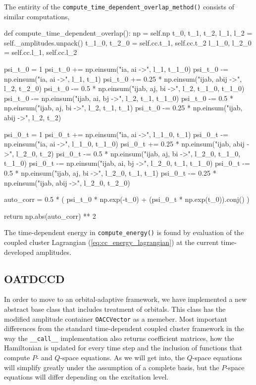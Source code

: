     The entirity of the \lstinline{compute_time_dependent_overlap_method()} consists of
    similar computations,
    \begin{python}
    def compute_time_dependent_overlap():
        np = self.np
        t_0, t_1, t_2, l_1, l_2 = self._amplitudes.unpack()
        t_1_0, t_2_0 = self.cc.t_1, self.cc.t_2 
        l_1_0, l_2_0 = self.cc.l_1, self.cc.l_2

        psi_t_0 = 1
        psi_t_0 += np.einsum("ia, ai ->", l_1, t_1_0)
        psi_t_0 -= np.einsum("ia, ai ->", l_1, t_1)
        psi_t_0 += 0.25 * np.einsum("ijab, abij ->", l_2, t_2_0)
        psi_t_0 -= 0.5 * np.einsum("ijab, aj, bi ->", l_2, t_1_0, t_1_0)
        psi_t_0 -= np.einsum("ijab, ai, bj ->", l_2, t_1, t_1_0)
        psi_t_0 -= 0.5 * np.einsum("ijab, aj, bi ->", l_2, t_1, t_1)
        psi_t_0 -= 0.25 * np.einsum("ijab, abij ->", l_2, t_2)
    
        psi_0_t = 1
        psi_0_t += np.einsum("ia, ai ->", l_1_0, t_1)
        psi_0_t -= np.einsum("ia, ai ->", l_1_0, t_1_0)
        psi_0_t += 0.25 * np.einsum("ijab, abij ->", l_2_0, t_2)
        psi_0_t -= 0.5 * np.einsum("ijab, aj, bi ->", l_2_0, t_1_0, t_1_0)
        psi_0_t -= np.einsum("ijab, ai, bj ->", l_2_0, t_1, t_1_0)
        psi_0_t -= 0.5 * np.einsum("ijab, aj, bi ->", l_2_0, t_1, t_1)
        psi_0_t -= 0.25 * np.einsum("ijab, abij ->", l_2_0, t_2_0)
    
        auto_corr = 0.5 * (
            psi_t_0 * np.exp(-t_0) 
            + (psi_0_t * np.exp(t_0)).conj()
        )

        return np.abs(auto_corr) ** 2
    \end{python}

    The time-dependent energy in \lstinline{compute_energy()} is found by evaluation of 
    the coupled cluster Lagrangian (\autoref{eq:cc_energy_lagrangian}) at the current 
    time-developed amplitudes.

    \subsection{OATDCCD}

    In order to move to an orbital-adaptive framework, we have implemented a new abstract 
    base class that includes treatment of orbitals. This class has the modified 
    amplitude container \lstinline{OACCVector} as a memeber. Most important differences 
    from the standard time-dependent coupled cluster framework in the way the 
    \lstinline{__call__} implementation also returns coefficient matrices, how the 
    Hamiltonian is updated for every time step and the inclusion of functions that 
    compute $P$- and $Q$-space equations. As we will get into, the $Q$-space equations 
    will simplify greatly under the assumption of a complete basis, but the $P$-space 
    equations will differ depending on the excitation level.

